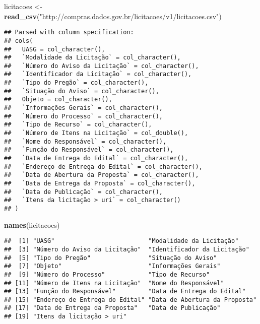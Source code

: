 \documentclass[]{article}
\newenvironment{Shaded}{\begin{snugshade}}{\end{snugshade}}
\newcommand{\KeywordTok}[1]{\textcolor[rgb]{0.13,0.29,0.53}{\textbf{#1}}}
\newcommand{\StringTok}[1]{\textcolor[rgb]{0.31,0.60,0.02}{#1}}
\newcommand{\NormalTok}[1]{#1}
\begin{document}
\begin{Shaded}
\begin{Highlighting}[]
\NormalTok{licitacoes <-}\StringTok{ }\KeywordTok{read_csv}\NormalTok{(}\StringTok{"http://compras.dados.gov.br/licitacoes/v1/licitacoes.csv"}\NormalTok{)}
\end{Highlighting}
\end{Shaded}

\begin{verbatim}
## Parsed with column specification:
## cols(
##   UASG = col_character(),
##   `Modalidade da Licitação` = col_character(),
##   `Número do Aviso da Licitação` = col_character(),
##   `Identificador da Licitação` = col_character(),
##   `Tipo do Pregão` = col_character(),
##   `Situação do Aviso` = col_character(),
##   Objeto = col_character(),
##   `Informações Gerais` = col_character(),
##   `Número do Processo` = col_character(),
##   `Tipo de Recurso` = col_character(),
##   `Número de Itens na Licitação` = col_double(),
##   `Nome do Responsável` = col_character(),
##   `Função do Responsável` = col_character(),
##   `Data de Entrega do Edital` = col_character(),
##   `Endereço de Entrega do Edital` = col_character(),
##   `Data de Abertura da Proposta` = col_character(),
##   `Data de Entrega da Proposta` = col_character(),
##   `Data de Publicação` = col_character(),
##   `Itens da licitação > uri` = col_character()
## )
\end{verbatim}

\begin{Shaded}
\begin{Highlighting}[]
\KeywordTok{names}\NormalTok{(licitacoes)}
\end{Highlighting}
\end{Shaded}

\begin{verbatim}
##  [1] "UASG"                          "Modalidade da Licitação"      
##  [3] "Número do Aviso da Licitação"  "Identificador da Licitação"   
##  [5] "Tipo do Pregão"                "Situação do Aviso"            
##  [7] "Objeto"                        "Informações Gerais"           
##  [9] "Número do Processo"            "Tipo de Recurso"              
## [11] "Número de Itens na Licitação"  "Nome do Responsável"          
## [13] "Função do Responsável"         "Data de Entrega do Edital"    
## [15] "Endereço de Entrega do Edital" "Data de Abertura da Proposta" 
## [17] "Data de Entrega da Proposta"   "Data de Publicação"           
## [19] "Itens da licitação > uri"
\end{verbatim}
\end{document}
